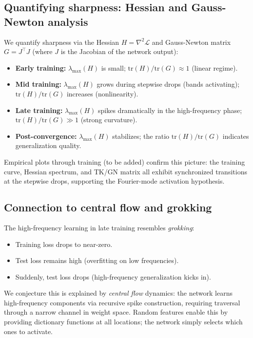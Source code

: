 \documentclass{article}
\begin{document}
\subsection{Quantifying sharpness: Hessian and Gauss-Newton analysis}
We quantify sharpness via the Hessian \( H = \nabla^2 \mathcal{L} \) and Gauss-Newton matrix \( G = J^\top J \) (where \( J \) is the Jacobian of the network output):
\begin{itemize}
    \item \textbf{Early training:} \( \lambda_{\max}(H) \) is small; \( \text{tr}(H)/\text{tr}(G) \approx 1 \) (linear regime).
    \item \textbf{Mid training:} \( \lambda_{\max}(H) \) grows during stepwise drops (bands activating); \( \text{tr}(H)/\text{tr}(G) \) increases (nonlinearity).
    \item \textbf{Late training:} \( \lambda_{\max}(H) \) spikes dramatically in the high-frequency phase; \( \text{tr}(H)/\text{tr}(G) \gg 1 \) (strong curvature).
    \item \textbf{Post-convergence:} \( \lambda_{\max}(H) \) stabilizes; the ratio \( \text{tr}(H)/\text{tr}(G) \) indicates generalization quality.
\end{itemize}

Empirical plots through training (to be added) confirm this picture: the training curve, Hessian spectrum, and TK/GN matrix all exhibit synchronized transitions at the stepwise drops, supporting the Fourier-mode activation hypothesis.

\vspace{1em}
\subsection{Connection to central flow and grokking}
The high-frequency learning in late training resembles \emph{grokking}:
\begin{itemize}
    \item Training loss drops to near-zero.
    \item Test loss remains high (overfitting on low frequencies).
    \item Suddenly, test loss drops (high-frequency generalization kicks in).
\end{itemize}
We conjecture this is explained by \emph{central flow} dynamics: the network learns high-frequency components via recursive spike construction, requiring traversal through a narrow channel in weight space. Random features enable this by providing dictionary functions at all locations; the network simply selects which ones to activate.
\end{document}
